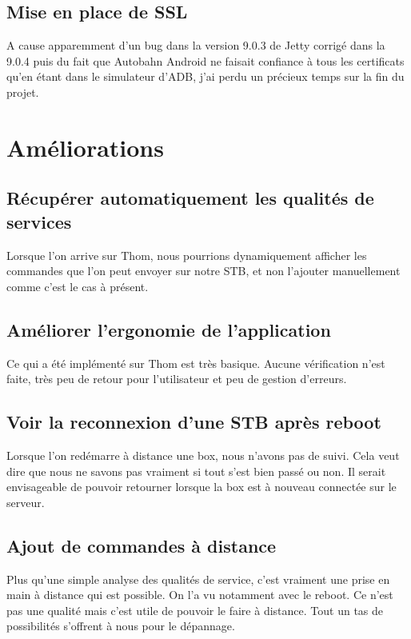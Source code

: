 \subsection{Mise en place de SSL}
A cause apparemment d'un bug dans la version 9.0.3 de Jetty corrigé dans la 9.0.4 puis du fait que Autobahn Android ne faisait confiance à tous les certificats qu'en étant dans le simulateur d'ADB, j'ai perdu un précieux temps sur la fin du projet.


\section{Améliorations} %
\label{sec:am_liorations}
\subsection{Récupérer automatiquement les qualités de services} %
Lorsque l'on arrive sur Thom, nous pourrions dynamiquement afficher les commandes que l'on peut envoyer sur notre STB, et non l'ajouter manuellement comme c'est le cas à présent.
\subsection{Améliorer l'ergonomie de l'application} %
Ce qui a été implémenté sur Thom est très basique. Aucune vérification n'est faite, très peu de retour pour l'utilisateur et peu de gestion d'erreurs.

\subsection{Voir la reconnexion d'une STB après reboot} %
Lorsque l'on redémarre à distance une box, nous n'avons pas de suivi. Cela veut dire que nous ne savons pas vraiment si tout s'est bien passé ou non. Il serait envisageable de pouvoir retourner lorsque la box est à nouveau connectée sur le serveur.

\subsection{Ajout de commandes à distance} %
Plus qu'une simple analyse des qualités de service, c'est vraiment une prise en main à distance qui est possible. On l'a vu notamment avec le reboot. Ce n'est pas une qualité mais c'est utile de pouvoir le faire à distance. Tout un tas de possibilités s'offrent à nous pour le dépannage.




